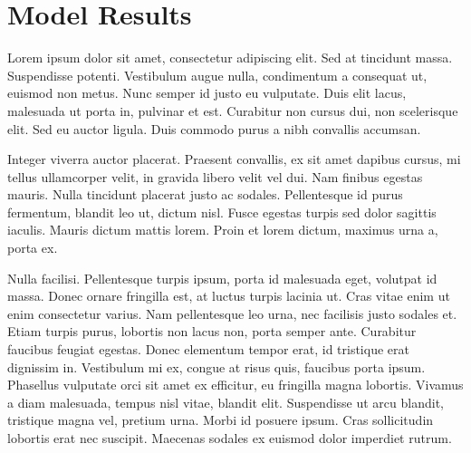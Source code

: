\section{Model Results}
Lorem ipsum dolor sit amet, consectetur adipiscing elit. Sed at tincidunt massa. Suspendisse potenti. Vestibulum augue nulla, condimentum a consequat ut, euismod non metus. Nunc semper id justo eu vulputate. Duis elit lacus, malesuada ut porta in, pulvinar et est. Curabitur non cursus dui, non scelerisque elit. Sed eu auctor ligula. Duis commodo purus a nibh convallis accumsan.

Integer viverra auctor placerat. Praesent convallis, ex sit amet dapibus cursus, mi tellus ullamcorper velit, in gravida libero velit vel dui. Nam finibus egestas mauris. Nulla tincidunt placerat justo ac sodales. Pellentesque id purus fermentum, blandit leo ut, dictum nisl. Fusce egestas turpis sed dolor sagittis iaculis. Mauris dictum mattis lorem. Proin et lorem dictum, maximus urna a, porta ex.

Nulla facilisi. Pellentesque turpis ipsum, porta id malesuada eget, volutpat id massa. Donec ornare fringilla est, at luctus turpis lacinia ut. Cras vitae enim ut enim consectetur varius. Nam pellentesque leo urna, nec facilisis justo sodales et. Etiam turpis purus, lobortis non lacus non, porta semper ante. Curabitur faucibus feugiat egestas. Donec elementum tempor erat, id tristique erat dignissim in. Vestibulum mi ex, congue at risus quis, faucibus porta ipsum. Phasellus vulputate orci sit amet ex efficitur, eu fringilla magna lobortis. Vivamus a diam malesuada, tempus nisl vitae, blandit elit. Suspendisse ut arcu blandit, tristique magna vel, pretium urna. Morbi id posuere ipsum. Cras sollicitudin lobortis erat nec suscipit. Maecenas sodales ex euismod dolor imperdiet rutrum.


